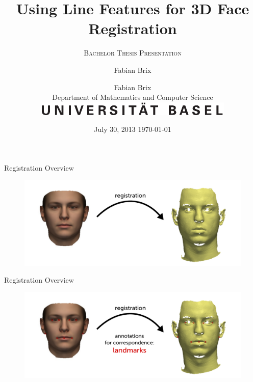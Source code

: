 \documentclass[xcolor=x11names,compress]{beamer}
\author{Fabian Brix}
\date{July 30, 2013}
\begin{document}

\begin{frame}
    \vspace*{\fill}
    \title[Bachelor Thesis]{Using Line Features for 3D Face Registration}
\subtitle{\scshape Bachelor Thesis Presentation}
    \author{Fabian Brix\\
        Department of Mathematics and Computer Science\\
        \includegraphics[width=.4\textwidth]{../resources/img/LogoUniBasel.pdf}}
        \date{
            \today
        }
        \titlepage
    \vspace*{\fill}
    \end{frame}

    \begin{frame}{Registration Overview}
        \begin{figure}
            \includegraphics[width=\textwidth]{../resources/figures/intro1.pdf}
        \end{figure}
    \end{frame}

    \begin{frame}{Registration Overview}
        \begin{figure}
            \includegraphics[width=\textwidth]{../resources/figures/intro2.pdf}
        \end{figure}
    \end{frame}
\end{document}
